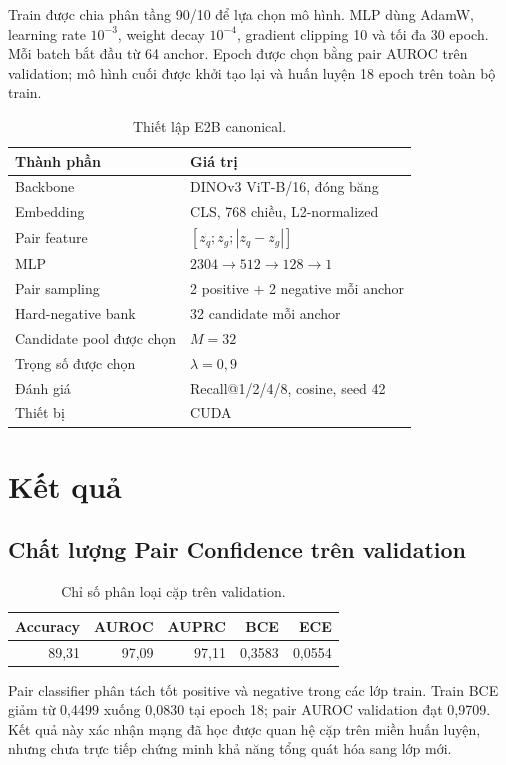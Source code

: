 \documentclass[11pt,a4paper]{article}
\begin{document}
Train được chia phân tầng 90/10 để lựa chọn mô hình. MLP dùng AdamW, learning rate $10^{-3}$, weight decay $10^{-4}$, gradient clipping 10 và tối đa 30 epoch. Mỗi batch bắt đầu từ 64 anchor. Epoch được chọn bằng pair AUROC trên validation; mô hình cuối được khởi tạo lại và huấn luyện 18 epoch trên toàn bộ train.

\begin{table}[htbp]
\centering
\caption{Thiết lập E2B canonical.}
\begin{tabular}{@{}ll@{}}
\toprule
Thành phần & Giá trị\\
\midrule
Backbone & DINOv3 ViT-B/16, đóng băng\\
Embedding & CLS, 768 chiều, L2-normalized\\
Pair feature & $[z_q;z_g;|z_q-z_g|]$\\
MLP & $2304\rightarrow512\rightarrow128\rightarrow1$\\
Pair sampling & 2 positive + 2 negative mỗi anchor\\
Hard-negative bank & 32 candidate mỗi anchor\\
Candidate pool được chọn & $M=32$\\
Trọng số được chọn & $\lambda=0,9$\\
Đánh giá & Recall@1/2/4/8, cosine, seed 42\\
Thiết bị & CUDA\\
\bottomrule
\end{tabular}
\end{table}

\section{Kết quả}
\subsection{Chất lượng Pair Confidence trên validation}

\begin{table}[htbp]
\centering
\caption{Chỉ số phân loại cặp trên validation.}
\begin{tabular}{@{}rrrrr@{}}
\toprule
Accuracy & AUROC & AUPRC & BCE & ECE\\
\midrule
89,31 & 97,09 & 97,11 & 0,3583 & 0,0554\\
\bottomrule
\end{tabular}
\end{table}

Pair classifier phân tách tốt positive và negative trong các lớp train. Train BCE giảm từ 0,4499 xuống 0,0830 tại epoch 18; pair AUROC validation đạt 0,9709. Kết quả này xác nhận mạng đã học được quan hệ cặp trên miền huấn luyện, nhưng chưa trực tiếp chứng minh khả năng tổng quát hóa sang lớp mới.
\end{document}
